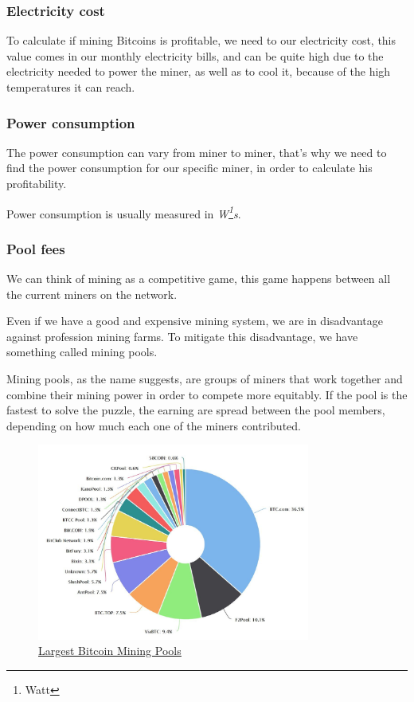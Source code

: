 \documentclass{article}
\newcommand\tab[1][1cm]{\hspace*{#1}}
\begin{document}
\subsubsection{Electricity cost}

\tab To calculate if mining Bitcoins is profitable, we need to our electricity cost, this value comes in our monthly electricity bills, and can be quite high due to the electricity needed to power the miner, as well as to cool it, because of the high temperatures it can reach.

\subsubsection{Power consumption}

\tab The power consumption can vary from miner to miner, that's why we need to find the power consumption for our specific miner, in order to calculate his profitability.  

Power consumption is usually measured in \textit{W\footnote{Watt}s}.

\newpage

\subsubsection{Pool fees}

\tab We can think of mining as a competitive game, this game happens between all the current miners on the network. 

Even if we have a good and expensive mining system, we are in disadvantage against profession mining farms. To mitigate this disadvantage, we have something called mining pools.

Mining pools, as the name suggests, are groups of miners that work together and combine their mining power in order to compete more equitably. If the pool is the fastest to solve the puzzle, the earning are spread between the pool members, depending on how much each one of the miners contributed.

\begin{figure}[H]
    \begin{center}
        \includegraphics[width=0.8\textwidth]{images/mining_pools.jpeg}
        \caption{\href{https://www.pinterest.pt/pin/601863937677057884/}{\underline{Largest Bitcoin Mining Pools}}}
    \end{center}
\end{figure}
\end{document}
